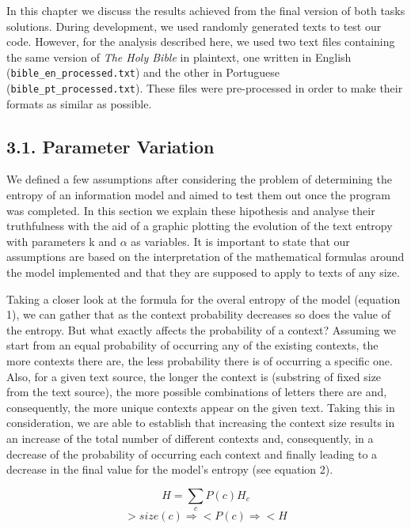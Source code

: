 \documentclass[12pt]{article}
\begin{document}
In this chapter we discuss the results achieved from the final version of 
both tasks solutions. 
During development, we used randomly generated texts to test our code.
However, for the analysis described here, we used two text files
containing the same version of {\it The Holy Bible\/} in plaintext, one 
written in English (\texttt{bible\_en\_processed.txt}) and the other in 
Portuguese (\texttt{bible\_pt\_processed.txt}).
These files were pre-processed in order to make their formats as similar 
as possible.

\subsection*{3.1. Parameter Variation}

We defined a few assumptions after considering the problem of determining
the entropy of an information model and aimed to test them out once the 
program was completed.
In this section we explain these hipothesis and analyse their truthfulness
with the aid of a graphic plotting the evolution of the text entropy with
parameters k and $\alpha$ as variables.
It is important to state that our assumptions are based on the interpretation
of the mathematical formulas around the model implemented and that they 
are supposed to apply to texts of any size.

Taking a closer look at the formula for the overal entropy of the model 
(equation 1), we can gather that as the context probability 
decreases so does the value of the entropy.
But what exactly affects the probability of a context? 
Assuming we start from an equal probability of occurring any of the existing
contexts, the more contexts there are, the less probability there is of 
occurring a specific one.
Also, for a given text source, the longer the context is (substring of fixed 
size from the text source), the more possible combinations of letters there 
are and, consequently, the more unique contexts appear on the given text.
Taking this in consideration, we are able to establish that increasing the 
context size results in an increase of the total number of different contexts
and, consequently, in a decrease of the probability of occurring each context
and finally leading to a decrease in the final value for the model's entropy
(see equation 2).

\begin{equation}
  H = \sum\limits_{c} P(c) H_{c}
\end{equation}
\begin{equation}
  >size(c) \Rightarrow <P(c) \Rightarrow <H
\end{equation}
\end{document}
